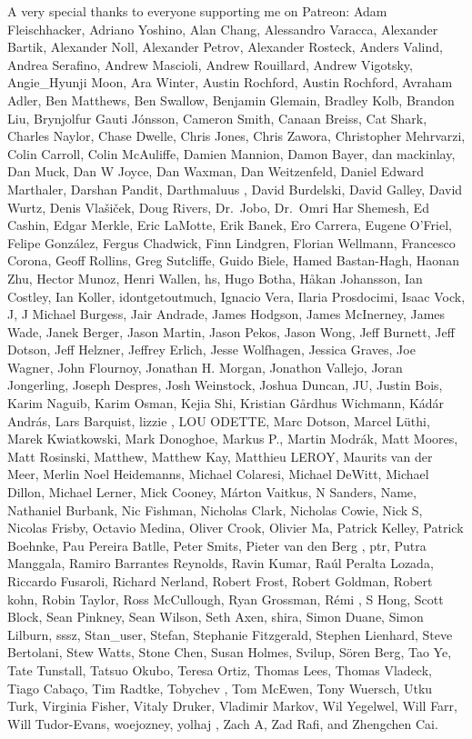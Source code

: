 \documentclass[
  letterpaper,
  DIV=11,
  numbers=noendperiod]{scrartcl}
\begin{document}
A very special thanks to everyone supporting me on Patreon: Adam
Fleischhacker, Adriano Yoshino, Alan Chang, Alessandro Varacca,
Alexander Bartik, Alexander Noll, Alexander Petrov, Alexander Rosteck,
Anders Valind, Andrea Serafino, Andrew Mascioli, Andrew Rouillard,
Andrew Vigotsky, Angie\_Hyunji Moon, Ara Winter, Austin Rochford, Austin
Rochford, Avraham Adler, Ben Matthews, Ben Swallow, Benjamin Glemain,
Bradley Kolb, Brandon Liu, Brynjolfur Gauti Jónsson, Cameron Smith,
Canaan Breiss, Cat Shark, Charles Naylor, Chase Dwelle, Chris Jones,
Chris Zawora, Christopher Mehrvarzi, Colin Carroll, Colin McAuliffe,
Damien Mannion, Damon Bayer, dan mackinlay, Dan Muck, Dan W Joyce, Dan
Waxman, Dan Weitzenfeld, Daniel Edward Marthaler, Darshan Pandit,
Darthmaluus , David Burdelski, David Galley, David Wurtz, Denis
Vlašiček, Doug Rivers, Dr.~Jobo, Dr.~Omri Har Shemesh, Ed Cashin, Edgar
Merkle, Eric LaMotte, Erik Banek, Ero Carrera, Eugene O'Friel, Felipe
González, Fergus Chadwick, Finn Lindgren, Florian Wellmann, Francesco
Corona, Geoff Rollins, Greg Sutcliffe, Guido Biele, Hamed Bastan-Hagh,
Haonan Zhu, Hector Munoz, Henri Wallen, hs, Hugo Botha, Håkan Johansson,
Ian Costley, Ian Koller, idontgetoutmuch, Ignacio Vera, Ilaria
Prosdocimi, Isaac Vock, J, J Michael Burgess, Jair Andrade, James
Hodgson, James McInerney, James Wade, Janek Berger, Jason Martin, Jason
Pekos, Jason Wong, Jeff Burnett, Jeff Dotson, Jeff Helzner, Jeffrey
Erlich, Jesse Wolfhagen, Jessica Graves, Joe Wagner, John Flournoy,
Jonathan H. Morgan, Jonathon Vallejo, Joran Jongerling, Joseph Despres,
Josh Weinstock, Joshua Duncan, JU, Justin Bois, Karim Naguib, Karim
Osman, Kejia Shi, Kristian Gårdhus Wichmann, Kádár András, Lars
Barquist, lizzie , LOU ODETTE, Marc Dotson, Marcel Lüthi, Marek
Kwiatkowski, Mark Donoghoe, Markus P., Martin Modrák, Matt Moores, Matt
Rosinski, Matthew, Matthew Kay, Matthieu LEROY, Maurits van der Meer,
Merlin Noel Heidemanns, Michael Colaresi, Michael DeWitt, Michael
Dillon, Michael Lerner, Mick Cooney, Márton Vaitkus, N Sanders, Name,
Nathaniel Burbank, Nic Fishman, Nicholas Clark, Nicholas Cowie, Nick S,
Nicolas Frisby, Octavio Medina, Oliver Crook, Olivier Ma, Patrick
Kelley, Patrick Boehnke, Pau Pereira Batlle, Peter Smits, Pieter van den
Berg , ptr, Putra Manggala, Ramiro Barrantes Reynolds, Ravin Kumar, Raúl
Peralta Lozada, Riccardo Fusaroli, Richard Nerland, Robert Frost, Robert
Goldman, Robert kohn, Robin Taylor, Ross McCullough, Ryan Grossman, Rémi
, S Hong, Scott Block, Sean Pinkney, Sean Wilson, Seth Axen, shira,
Simon Duane, Simon Lilburn, sssz, Stan\_user, Stefan, Stephanie
Fitzgerald, Stephen Lienhard, Steve Bertolani, Stew Watts, Stone Chen,
Susan Holmes, Svilup, Sören Berg, Tao Ye, Tate Tunstall, Tatsuo Okubo,
Teresa Ortiz, Thomas Lees, Thomas Vladeck, Tiago Cabaço, Tim Radtke,
Tobychev , Tom McEwen, Tony Wuersch, Utku Turk, Virginia Fisher, Vitaly
Druker, Vladimir Markov, Wil Yegelwel, Will Farr, Will Tudor-Evans,
woejozney, yolhaj , Zach A, Zad Rafi, and Zhengchen Cai.
\end{document}
